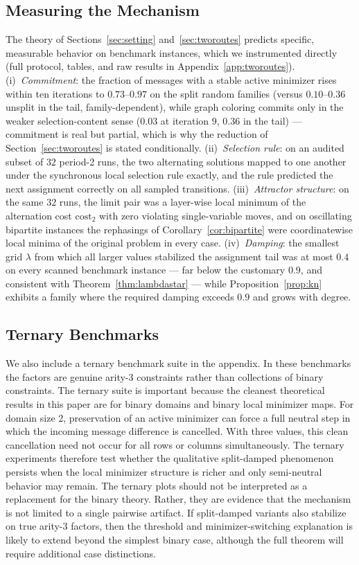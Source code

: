\documentclass[letterpaper]{article} %
\theoremstyle{definition}
\theoremstyle{remark}
\begin{document}
\subsection{Measuring the Mechanism}
\label{sec:mechanism}
The theory of Sections~\ref{sec:setting} and~\ref{sec:tworoutes} predicts
specific, measurable behavior on benchmark instances, which we instrumented
directly (full protocol, tables, and raw results in
Appendix~\ref{app:tworoutes}).  (i)~\emph{Commitment}: the fraction of
messages with a stable active minimizer rises within ten iterations to
$0.73$--$0.97$ on the split random families (versus $0.10$--$0.36$ unsplit
in the tail, family-dependent), while graph coloring commits only in the
weaker selection-content sense ($0.03$ at iteration $9$, $0.36$ in the
tail) --- commitment is real but partial, which is why the reduction of
Section~\ref{sec:tworoutes} is stated conditionally.  (ii)~\emph{Selection
rule}: on an audited subset of $32$ period-2 runs, the two alternating
solutions mapped to one another under the synchronous local selection rule
exactly, and the rule predicted the next assignment correctly on all
sampled transitions.  (iii)~\emph{Attractor structure}: on the same $32$
runs, the limit pair was a layer-wise local minimum of the alternation
cost $\mathrm{cost}_2$ with zero violating single-variable moves, and on
oscillating bipartite instances the rephasings of
Corollary~\ref{cor:bipartite} were coordinatewise local minima of the
original problem in every case.  (iv)~\emph{Damping}: the smallest grid
$\lambda$ from which all larger values stabilized the assignment tail was
at most $0.4$ on every scanned benchmark instance --- far below the
customary $0.9$, and consistent with Theorem~\ref{thm:lambdastar} ---
while Proposition~\ref{prop:kn} exhibits a family where the required
damping exceeds $0.9$ and grows with degree.
\subsection{Ternary Benchmarks}
We also include a ternary benchmark suite in the appendix.  In these benchmarks
the factors are genuine arity-3 constraints rather than collections of binary
constraints.  The ternary suite is important because the cleanest theoretical
results in this paper are for binary domains and binary local minimizer maps.
For domain size 2, preservation of an active minimizer can force a full neutral
step in which the incoming message difference is cancelled.  With three values,
this clean cancellation need not occur for all rows or columns simultaneously.
The ternary experiments therefore test whether the qualitative split-damped
phenomenon persists when the local minimizer structure is richer and only
semi-neutral behavior may remain.
The ternary plots should not be interpreted as a replacement for the binary
theory.  Rather, they are evidence that the mechanism is not limited to a
single pairwise artifact.  If split-damped variants also stabilize on true
arity-3 factors, then the threshold and minimizer-switching explanation is
likely to extend beyond the simplest binary case, although the full theorem
will require additional case distinctions.
\end{document}
